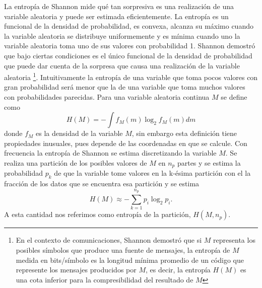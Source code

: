 \documentclass[letterpaper,12pt]{book}
\begin{document}
La entropía de Shannon \cite{shannon_mathematical_1948} mide qué tan sorpresiva es una realización de una variable aleatoria y puede ser estimada eficientemente. La entropía es un funcional de la densidad de probabilidad, es convexa, alcanza su máximo cuando la variable aleatoria se distribuye uniformemente y es mínima cuando uno la variable aleatoria toma uno de sus valores con probabilidad 1. Shannon demostró que bajo ciertas condiciones es el único funcional de la densidad de probabilidad que puede dar cuenta de la sorpresa que causa una realización de la variable aleatoria \cite{shannon_mathematical_1948}\footnote{En el contexto de comunicaciones, Shannon demostró que si $M$ representa los posibles símbolos que produce una fuente de mensajes, la entropía de $M$ medida en bits/símbolo es la longitud mínima promedio de un código que represente los mensajes producidos por $M$, es decir, la entropía $H(M)$ es una cota inferior para la compresibilidad del resultado de $M$}. Intuitivamente la entropía de una variable que toma pocos valores con gran probabilidad será menor que la de una variable que toma muchos valores con probabilidades parecidas. Para una variable aleatoria continua $M$ se define como
\begin{equation}
  H(M)=-\int f_M(m)\log_2f_M(m)dm
\end{equation}
donde $f_M$ es la densidad de la variable $M$, sin embargo esta definición tiene propiedades inusuales, pues depende de las coordenadas en que se calcule. Con frecuencia la entropía de Shannon se estima discretizando la variable $M$. Se realiza una partición de los posibles valores de $M$ en $n_p$ partes y se estima la probabilidad $p_k$ de que la variable tome valores en la k-ésima partición con el la fracción de los datos que se encuentra esa partición y se estima
\begin{equation}
  H(M)\approx-\sum_{k=1}^{n_p}p_i\log_2 p_i.
\end{equation}
A esta cantidad nos referimos como entropía de la partición, $H(M,n_p)$.
\end{document}
